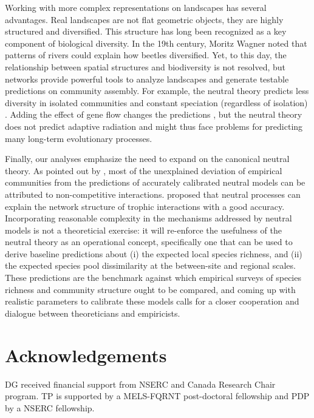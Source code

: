 \documentclass[12pt]{article}
\begin{document}
Working with more complex representations on landscapes has several advantages.
Real landscapes are not flat geometric objects, they are highly structured and
diversified. This structure has long been recognized as a key component of
biological diversity. In the 19th century, Moritz Wagner noted that patterns of
rivers \cite{coy04} could explain how beetles diversified. Yet, to this day, the
relationship between spatial structures and biodiversity is not resolved, but
networks provide powerful tools to analyze landscapes and generate testable
predictions on community assembly. For example, the neutral theory predicts less
diversity in isolated communities and constant speciation (regardless of
isolation) \parencite{Economo2008}. Adding the effect of gene flow changes the
predictions \parencite{Desjardins2012b}, but the neutral theory does not predict
adaptive radiation and might thus face problems for predicting many long-term
evolutionary processes.

Finally, our analyses emphasize the need to expand on the canonical neutral
theory. As pointed out by \textcite{Wootton2005}, most of the unexplained
deviation of empirical communities from the predictions of accurately calibrated
neutral models can be attributed to non-competitive interactions. \textcite{Canard2012}
proposed that neutral processes can explain the network structure of trophic
interactions with a good accuracy. Incorporating reasonable complexity in the
mechanisms addressed by neutral models is not a theoreticial exercise: it will
re-enforce the usefulness of the neutral theory as an operational concept,
specifically one that can be used to derive baseline predictions about (i) the
expected local species richness, and (ii) the expected species pool
dissimilarity at the between-site and regional scales. These predictions are the
benchmark against which empirical surveys of species richness and community
structure ought to be compared, and coming up with realistic parameters to
calibrate these models calls for a closer cooperation and dialogue between
theoreticians and empiricists.

\section*{Acknowledgements}
DG received financial support from NSERC and Canada Research Chair program. TP
is supported by a MELS-FQRNT post-doctoral fellowship and PDP by a NSERC
fellowship.
\newpage
\end{document}
